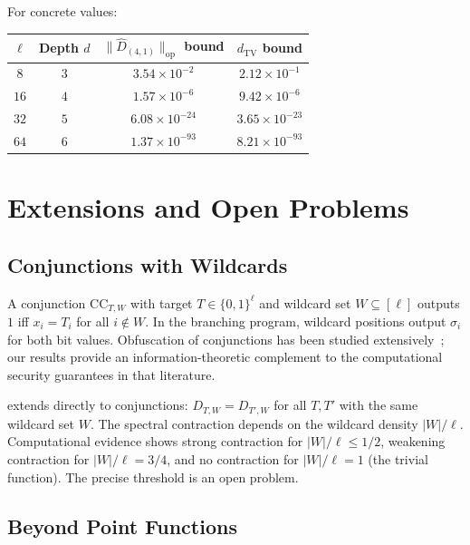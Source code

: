 \documentclass[11pt]{article}
\newcommand{\norm}[1]{\lVert #1 \rVert}
\newcommand{\opn}[1]{\norm{#1}_{\mathrm{op}}}
\newcommand{\dtv}{d_{\mathrm{TV}}}
\newcommand{\Dhat}{\widehat{D}}
\newcommand{\CC}{\mathrm{CC}}
\begin{document}
For concrete values:
\begin{center}
\begin{tabular}{cccc}
\toprule
$\ell$ & Depth $d$ & $\opn{\Dhat_{(4,1)}}$ bound & $\dtv$ bound \\
\midrule
$8$   & $3$ & $3.54 \times 10^{-2}$ & $2.12 \times 10^{-1}$ \\
$16$  & $4$ & $1.57 \times 10^{-6}$ & $9.42 \times 10^{-6}$ \\
$32$  & $5$ & $6.08 \times 10^{-24}$ & $3.65 \times 10^{-23}$ \\
$64$  & $6$ & $1.37 \times 10^{-93}$ & $8.21 \times 10^{-93}$ \\
\bottomrule
\end{tabular}
\end{center}


\section{Extensions and Open Problems}
\label{sec:extensions}

\subsection{Conjunctions with Wildcards}

A conjunction $\CC_{T,W}$ with target $T \in \{0,1\}^\ell$ and wildcard set
$W \subseteq [\ell]$ outputs $1$ iff $x_i = T_i$ for all $i \notin W$.
In the branching program, wildcard positions output $\sigma_i$ for both
bit values.  Obfuscation of conjunctions has been studied
extensively~\cite{BVWW16,BKMPRS18,BLMZ19}; our results provide an
information-theoretic complement to the computational security guarantees
in that literature.

 extends directly to conjunctions:
$D_{T,W} = D_{T',W}$ for all $T, T'$ with the same wildcard set $W$.
The spectral contraction depends on the wildcard density $|W|/\ell$.
Computational evidence shows strong contraction for $|W|/\ell \leq 1/2$,
weakening contraction for $|W|/\ell = 3/4$, and no contraction for $|W|/\ell = 1$
(the trivial function). The precise threshold is an open problem.


\subsection{Beyond Point Functions}
\end{document}
